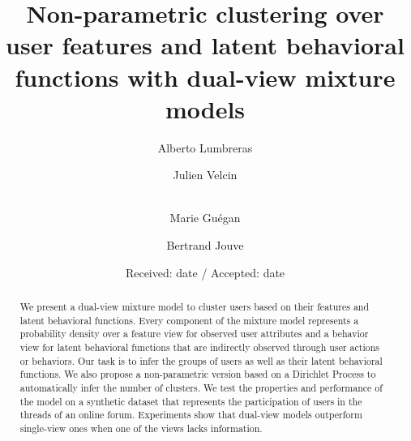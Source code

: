 \documentclass[smallextended]{svjour3}          %
\begin{document}
\title{Non-parametric clustering over user features and latent behavioral functions with dual-view mixture models}

\author{Alberto Lumbreras \and
        Julien Velcin  \and\\
        Marie Guégan \and
        Bertrand Jouve
}



\date{Received: date / Accepted: date}

\maketitle
\begin{abstract}
We present a dual-view mixture model to cluster users based on their features and latent behavioral functions. Every component of the mixture model represents a probability density over a feature view for observed user attributes and a behavior view for latent behavioral functions that are indirectly observed through user actions or behaviors. Our task is to infer the groups of users as well as their latent behavioral functions. We also propose a non-parametric version based on a Dirichlet Process to automatically infer the number of clusters. We test the properties and performance of the model on a synthetic dataset that represents the participation of users in the threads of an online forum. Experiments show that dual-view models outperform single-view ones when one of the views lacks information.
\end{abstract}
\end{document}
